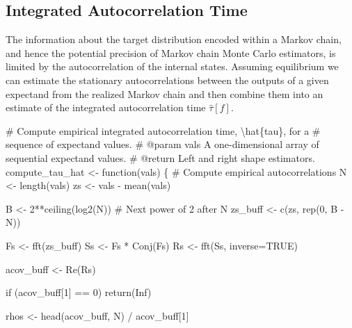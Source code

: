 \documentclass[
  letterpaper,
  DIV=11,
  numbers=noendperiod]{scrartcl}
\newenvironment{Shaded}{\begin{snugshade}}{\end{snugshade}}
\newcommand{\CommentTok}[1]{\textcolor[rgb]{0.37,0.37,0.37}{#1}}
\newcommand{\ControlFlowTok}[1]{\textcolor[rgb]{0.00,0.23,0.31}{#1}}
\newcommand{\DecValTok}[1]{\textcolor[rgb]{0.68,0.00,0.00}{#1}}
\newcommand{\NormalTok}[1]{\textcolor[rgb]{0.00,0.23,0.31}{#1}}
\newcommand{\OperatorTok}[1]{\textcolor[rgb]{0.37,0.37,0.37}{#1}}
\begin{document}
\subsection{Integrated Autocorrelation
Time}\label{integrated-autocorrelation-time}

The information about the target distribution encoded within a Markov
chain, and hence the potential precision of Markov chain Monte Carlo
estimators, is limited by the autocorrelation of the internal states.
Assuming equilibrium we can estimate the stationary autocorrelations
between the outputs of a given expectand from the realized Markov chain
and then combine them into an estimate of the integrated autocorrelation
time \(\hat{\tau}[f]\).

\begin{Shaded}
\begin{Highlighting}[]
\CommentTok{\# Compute empirical integrated autocorrelation time, \textbackslash{}hat\{tau\}, for a}
\CommentTok{\# sequence of expectand values.}
\CommentTok{\# @param vals A one{-}dimensional array of sequential expectand values.}
\CommentTok{\# @return Left and right shape estimators.}
\NormalTok{compute\_tau\_hat }\OperatorTok{\textless{}{-}}\NormalTok{ function(vals) \{}
  \CommentTok{\# Compute empirical autocorrelations}
\NormalTok{  N }\OperatorTok{\textless{}{-}}\NormalTok{ length(vals)}
\NormalTok{  zs }\OperatorTok{\textless{}{-}}\NormalTok{ vals }\OperatorTok{{-}}\NormalTok{ mean(vals)}

\NormalTok{  B }\OperatorTok{\textless{}{-}} \DecValTok{2}\OperatorTok{**}\NormalTok{ceiling(log2(N)) }\CommentTok{\# Next power of 2 after N}
\NormalTok{  zs\_buff }\OperatorTok{\textless{}{-}}\NormalTok{ c(zs, rep(}\DecValTok{0}\NormalTok{, B }\OperatorTok{{-}}\NormalTok{ N))}

\NormalTok{  Fs }\OperatorTok{\textless{}{-}}\NormalTok{ fft(zs\_buff)}
\NormalTok{  Ss }\OperatorTok{\textless{}{-}}\NormalTok{ Fs }\OperatorTok{*}\NormalTok{ Conj(Fs)}
\NormalTok{  Rs }\OperatorTok{\textless{}{-}}\NormalTok{ fft(Ss, inverse}\OperatorTok{=}\NormalTok{TRUE)}

\NormalTok{  acov\_buff }\OperatorTok{\textless{}{-}}\NormalTok{ Re(Rs)}

  \ControlFlowTok{if}\NormalTok{ (acov\_buff[}\DecValTok{1}\NormalTok{] }\OperatorTok{==} \DecValTok{0}\NormalTok{)}
    \ControlFlowTok{return}\NormalTok{(Inf)}

\NormalTok{  rhos }\OperatorTok{\textless{}{-}}\NormalTok{ head(acov\_buff, N) }\OperatorTok{/}\NormalTok{ acov\_buff[}\DecValTok{1}\NormalTok{]}


\end{Highlighting}
\end{Shaded}
\end{document}
